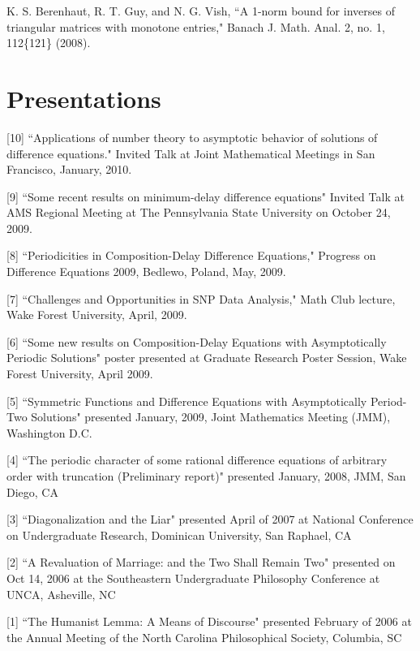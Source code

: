 \documentclass[overlapped,line,letterpaper]{res}
\begin{document}
\begin{resume}
[1] K. S. Berenhaut, R. T. Guy, and N. G. Vish, ``A 1-norm bound for inverses of triangular matrices
with monotone entries," Banach J. Math. Anal. 2, no. 1, 112\{121\}  (2008).



\section{\bf Presentations}
%
[10] ``Applications of number theory to asymptotic behavior of solutions of difference equations."  Invited Talk at Joint Mathematical Meetings in San Francisco, January, 2010.

[9] ``Some recent results on minimum-delay difference equations" Invited Talk at AMS Regional Meeting at The Pennsylvania State University on October 24, 2009.

[8] ``Periodicities in Composition-Delay Difference Equations," Progress on Difference Equations 2009, Bedlewo, Poland, May, 2009.

[7] ``Challenges and Opportunities in SNP Data Analysis," Math Club lecture, Wake Forest University, April, 2009. 

[6] ``Some new results on Composition-Delay Equations with Asymptotically Periodic Solutions" poster presented at Graduate Research Poster Session, Wake Forest University, April 2009.

[5] ``Symmetric Functions and Difference Equations with Asymptotically Period-Two Solutions" presented January, 2009, Joint Mathematics Meeting (JMM), Washington D.C.

[4] ``The periodic character of some rational difference equations of arbitrary order with truncation (Preliminary report)" presented January, 2008, JMM, San Diego, CA

[3] ``Diagonalization and the Liar" presented April of 2007 at National Conference on Undergraduate Research, Dominican University, San Raphael, CA

[2] ``A Revaluation of Marriage: and the Two Shall Remain Two" presented on Oct 14, 2006 at the Southeastern Undergraduate Philosophy Conference at UNCA, Asheville, NC

[1] ``The Humanist Lemma: A Means of Discourse" presented February of 2006 at the Annual Meeting of the North Carolina Philosophical Society, Columbia, SC



\end{resume}
\end{document}
